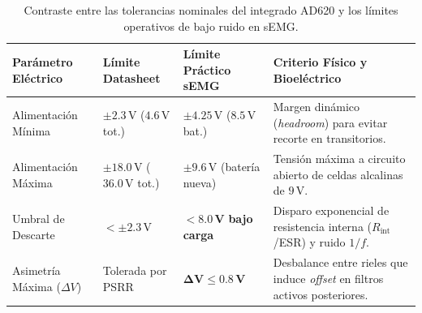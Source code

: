 \documentclass[11pt,a4paper]{article}
\begin{document}
\begin{table}[H]
\centering
\small
\begin{tabularx}{\textwidth}{l p{2.8cm} p{3.1cm} X}
\toprule
\textbf{Parámetro Eléctrico} & \textbf{Límite Datasheet} & \textbf{Límite Práctico sEMG} & \textbf{Criterio Físico y Bioeléctrico} \\
\midrule
Alimentación Mínima & $\pm 2.3\,\text{V}$ ($4.6\,\text{V}$ tot.) & $\pm 4.25\,\text{V}$ ($8.5\,\text{V}$ bat.) & Margen dinámico (\textit{headroom}) para evitar recorte en transitorios. \\
Alimentación Máxima & $\pm 18.0\,\text{V}$ ($36.0\,\text{V}$ tot.) & $\pm 9.6\,\text{V}$ (batería nueva) & Tensión máxima a circuito abierto de celdas alcalinas de $9\,\text{V}$. \\
Umbral de Descarte & $< \pm 2.3\,\text{V}$ & $\mathbf{< 8.0\,\text{V}}$ \textbf{bajo carga} & Disparo exponencial de resistencia interna ($R_{\text{int}}$/ESR) y ruido $1/f$. \\
Asimetría Máxima ($\Delta V$) & Tolerada por PSRR & $\mathbf{\Delta V \le 0.8\,\text{V}}$ & Desbalance entre rieles que induce \textit{offset} en filtros activos posteriores. \\
\bottomrule
\end{tabularx}
\caption{Contraste entre las tolerancias nominales del integrado AD620 y los límites operativos de bajo ruido en sEMG.}
\label{tab:baterias}
\end{table}
\end{document}
